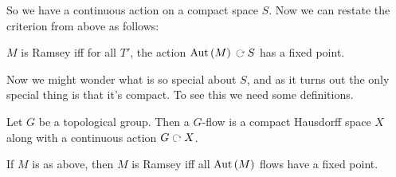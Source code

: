 \documentclass{amsart}
\begin{document}
So we have a continuous action on a compact space $S$. Now we can restate the criterion
from above as follows:
\begin{center}
$M$ is Ramsey iff for all $T'$, the action $\Aut\left( M \right)\acts S$ has a fixed
point.
\end{center}
Now we might wonder what is so special about $S$, and as it turns out the only special
thing is that it's compact. 
To see this we need some definitions. 

\begin{defn}
Let $G$ be a topological group. Then a $G$-flow is a compact Hausdorff space $X$ along with a
continuous action $G\acts X$.
\end{defn}

\begin{thm}[KPT]
If $M$ is as above, then $M$ is Ramsey iff all $\operatorname{Aut}\left( M \right)$ flows have a fixed
point.
\end{thm}
\end{document}
